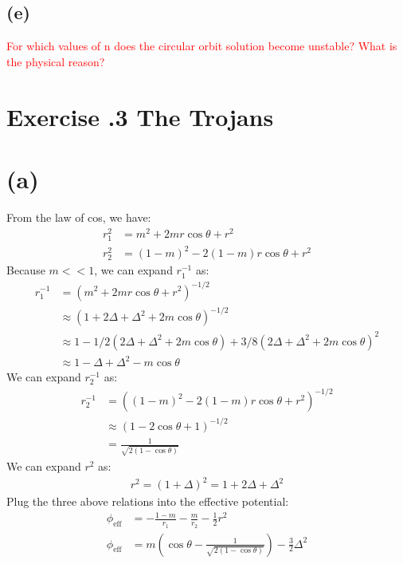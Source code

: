 \documentclass[a4paper,12pt]{article}
\begin{document}
\subsection*{(e)}
\textcolor{red}{For which values of n does the circular orbit solution become unstable? What is the physical
reason?}

\section*{\textbf{Exercise \uppercase\expandafter{}.3 The Trojans}}
\section*{(a)}
From the law of cos, we have:
\begin{align*}
    r_1^2 &= m^2 + 2mr\cos \theta + r^2 \\
    r_2^2 &= (1-m)^2 - 2(1-m)r \cos \theta + r^2
\end{align*}
Because $m<<1$, we can expand $r_1^{-1}$ as:
\begin{align*}
    r_1^{-1} &= (m^2 + 2mr\cos \theta + r^2)^{-1/2} \\
            &\approx (1 + 2\Delta + \Delta^2 + 2m\cos \theta)^{-1/2} \\
            &\approx 1 - 1/2 (2\Delta + \Delta^2 + 2m\cos \theta) + 3/8 (2\Delta + \Delta^2 + 2m\cos \theta)^2 \\
            &\approx 1 - \Delta + \Delta^2 -m \cos \theta
\end{align*}
We can expand $r_2^{-1}$ as:
\begin{align*}
    r_2^{-1} &= ((1-m)^2 - 2(1-m)r \cos \theta + r^2)^{-1/2} \\
            &\approx (1 - 2 \cos \theta + 1)^{-1/2} \\
            &= \frac{1}{\sqrt{2(1- \cos \theta)}}
\end{align*}
We can expand $r^2$ as:
\begin{align*}
    r^2 = (1+\Delta)^2 = 1 + 2\Delta + \Delta^2
\end{align*}
Plug the three above relations into the effective potential:
\begin{align*}
    \phi_{\text{eff}} &= -\frac{1-m}{r_1} - \frac{m}{r_2} - \frac{1}{2}r^2 \\
    \phi_{\text{eff}} &= m(\cos \theta - \frac{1}{\sqrt{2(1- \cos \theta)}}) - \frac{3}{2}\Delta^2
\end{align*}
\end{document}
